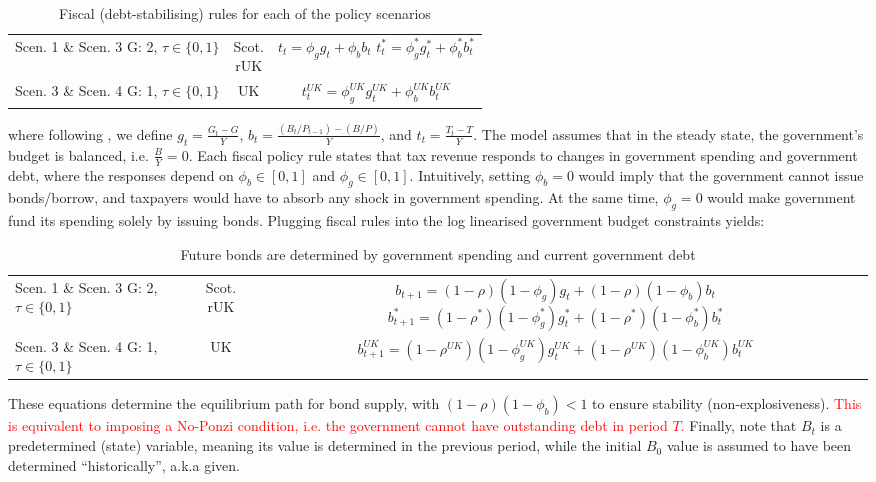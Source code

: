 \begin{table}[H]
    \renewcommand{\arraystretch}{2}
    \centering
    \begin{tabular}{l|c|c}
        \makecell{Scen. 1 \& Scen. 3\\ G: 2, $\tau \in \{0, 1\}$} & \makecell{Scot. \\ rUK } & 
        \makecell{
            $t_t = \phi_g  g_t + \phi_b b_t$\\
            $t^*_t = \phi^*_g g^*_t + \phi^*_b b^*_t$\\
        }  \\ 
        \makecell{Scen. 3 \& Scen. 4\\ G: 1, $\tau \in \{0, 1\}$} & UK & 
        $t^{UK}_t = \phi^{UK}_g g^{UK}_t + \phi^{UK}_b b^{UK}_t$
    \end{tabular}
    \caption{Fiscal (debt-stabilising) rules for each of the policy scenarios}
\end{table}
where following \textcite{jordigal_2005_understanding}, we define $g_t = \frac{G_t-G}{Y}$, $b_t = \frac{(B_t/P_{t-1}) - (B/P)}{Y}$, and $t_t = \frac{T_t - T}{Y}$. The model assumes that in the steady state, the government's budget is balanced, i.e. $\frac{B}{Y} = 0$. Each fiscal policy rule states that tax revenue responds to changes in government spending and government debt, where the responses depend on $\phi_b \in [0,1]$ and $\phi_g \in [0,1]$. Intuitively, setting $\phi_b = 0$ would imply that the government cannot issue bonds/borrow, and taxpayers would have to absorb any shock in government spending. At the same time, $\phi_g = 0$ would make government fund its spending solely by issuing bonds. Plugging fiscal rules into the log linearised government budget constraints yields:
\begin{table}[H]
    \renewcommand{\arraystretch}{2}
    \centering
    \begin{tabular}{l|c|c}
    \makecell{Scen. 1 \& Scen. 3\\ G: 2, $\tau \in \{0, 1\}$} & \makecell{Scot. \\ rUK } & 
        \makecell{
            $b_{t+1} = (1-\rho)(1-\phi_g) g_t + (1-\rho)(1-\phi_b)b_t$\\
            $b^*_{t+1} = (1-\rho^*)(1-\phi^*_g) g^*_t + (1-\rho^*)(1-\phi^*_b)b^*_t$
        }  \\ 
    \makecell{Scen. 3 \& Scen. 4\\ G: 1, $\tau \in \{0, 1\}$} & UK & 
    $b^{UK}_{t+1} = (1-\rho^{UK})(1-\phi^{UK}_g) g^{UK}_t + (1-\rho^{UK})(1-\phi^{UK}_b)b^{UK}_t$
    \end{tabular}
    \caption{Future bonds are determined by government spending and current government debt}
\end{table}
These equations determine the equilibrium path for bond supply, with \linebreak $(1-\rho)(1-\phi_b) < 1$ to ensure stability (non-explosiveness). \textcolor{red}{This is equivalent to imposing a No-Ponzi condition, i.e. the government cannot have outstanding debt in period $T$.} Finally, note that $B_t$ is a predetermined (state) variable, meaning its value is determined in the previous period, while the initial $B_0$ value is assumed to have been determined ``historically'', a.k.a given.